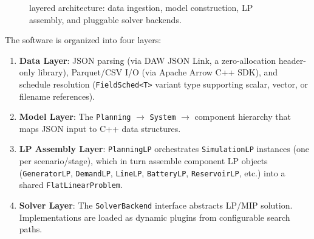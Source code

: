 \begin{figure}[t]
  \centering
  \caption{\gtopt{} layered architecture: data ingestion, model
    construction, LP assembly, and pluggable solver backends.}
  \label{fig:arch_layers}
\end{figure}

The software is organized into four layers:

\begin{enumerate}
  \item \textbf{Data Layer}: JSON parsing (via DAW JSON Link, a
    zero-allocation header-only library), Parquet/CSV I/O (via Apache
    Arrow C++ SDK), and schedule resolution (\texttt{FieldSched<T>}
    variant type supporting scalar, vector, or filename references).
  \item \textbf{Model Layer}: The \texttt{Planning} $\rightarrow$
    \texttt{System} $\rightarrow$ component hierarchy that maps JSON
    input to C++ data structures.
  \item \textbf{LP Assembly Layer}: \texttt{PlanningLP} orchestrates
    \texttt{SimulationLP} instances (one per scenario/stage), which in
    turn assemble component LP objects (\texttt{GeneratorLP},
    \texttt{DemandLP}, \texttt{LineLP}, \texttt{BatteryLP},
    \texttt{ReservoirLP}, etc.) into a shared
    \texttt{FlatLinearProblem}.
  \item \textbf{Solver Layer}: The \texttt{SolverBackend} interface
    abstracts LP/MIP solution.  Implementations are loaded as dynamic
    plugins from configurable search paths.
\end{enumerate}

